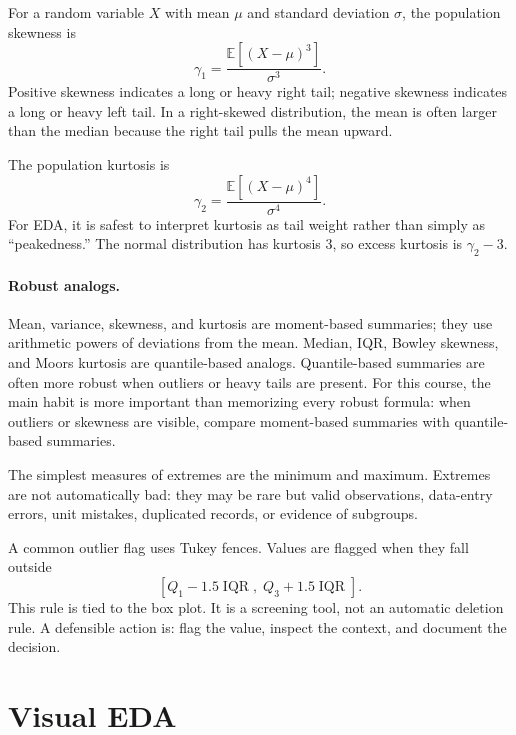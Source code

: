 {For a random variable $X$ with mean $\mu$ and standard deviation $\sigma$, the population skewness is
\begin{equation}
  \gamma_1=\frac{\mathbb{E}[(X-\mu)^3]}{\sigma^3}.
  \label{eq:ch4-skewness}
\end{equation}
Positive skewness indicates a long or heavy right tail; negative skewness indicates a long or heavy left tail.  In a right-skewed distribution, the mean is often larger than the median because the right tail pulls the mean upward.

The population kurtosis is
\begin{equation}
  \gamma_2=\frac{\mathbb{E}[(X-\mu)^4]}{\sigma^4}.
  \label{eq:ch4-kurtosis}
\end{equation}
For EDA, it is safest to interpret kurtosis as tail weight rather than simply as ``peakedness.''  The normal distribution has kurtosis $3$, so excess kurtosis is $\gamma_2-3$.

\paragraph{Robust analogs.}
Mean, variance, skewness, and kurtosis are moment-based summaries; they use arithmetic powers of deviations from the mean.  Median, IQR, Bowley skewness, and Moors kurtosis are quantile-based analogs.  Quantile-based summaries are often more robust when outliers or heavy tails are present.  For this course, the main habit is more important than memorizing every robust formula: when outliers or skewness are visible, compare moment-based summaries with quantile-based summaries.

The simplest measures of extremes are the minimum and maximum.  Extremes are not automatically bad: they may be rare but valid observations, data-entry errors, unit mistakes, duplicated records, or evidence of subgroups.

A common outlier flag uses Tukey fences.  Values are flagged when they fall outside
\begin{equation}
  \left[Q_1-1.5\operatorname{IQR},\;Q_3+1.5\operatorname{IQR}\right].
  \label{eq:ch4-tukey-fences}
\end{equation}
This rule is tied to the box plot.  It is a screening tool, not an automatic deletion rule.  A defensible action is: flag the value, inspect the context, and document the decision.

\section{Visual EDA}

}

